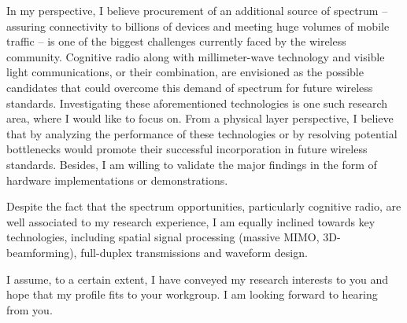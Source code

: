 \documentclass[11pt,a4paper,sans]{moderncv}        %
\begin{document}
In my perspective, I believe procurement of an additional source of spectrum -- assuring connectivity to billions of devices and meeting huge volumes of mobile traffic -- is one of the biggest challenges currently faced by the wireless community. Cognitive radio along with millimeter-wave technology and visible light communications, or their combination, are envisioned as the possible candidates that could overcome this demand of spectrum for future wireless standards. Investigating these aforementioned technologies is one such research area, where I would like to focus on. From a physical layer perspective, I believe that by analyzing the performance of these technologies or by resolving potential bottlenecks would promote their successful incorporation in future wireless standards. Besides, I am willing to validate the major findings in the form of hardware implementations or demonstrations. %

Despite the fact that the spectrum opportunities, particularly cognitive radio, are well associated to my research experience, I am equally inclined towards key technologies, including spatial signal processing (massive MIMO, 3D-beamforming), full-duplex transmissions and waveform design. 

I assume, to a certain extent, I have conveyed my research interests to you and hope that my profile fits to your workgroup. I am looking forward to hearing from you. 


\makeletterclosing
\end{document}
